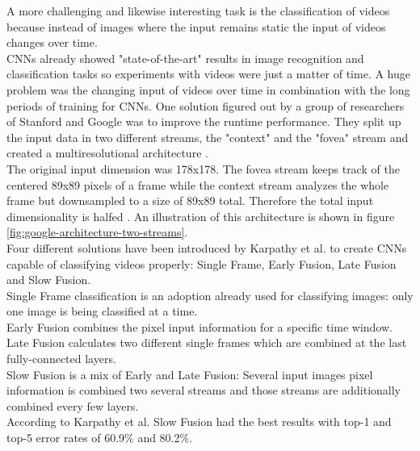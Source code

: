 \documentclass[12pt,twoside]{article}
\theoremstyle{plain}
\theoremstyle{definition}
\theoremstyle{remark}
\begin{document}
A more challenging and likewise interesting task is the classification of videos because instead of images where the input remains static the input of videos changes over time.
\\
CNNs already showed "state-of-the-art" results in image recognition and classification tasks so experiments with videos were just a matter of time. A huge problem was the changing input of videos over time in combination with the long periods of training for CNNs. One solution figured out by a group of researchers of Stanford and Google was to improve the runtime performance. They split up the input data in two different streams, the "context" and the "fovea" stream and created a multiresolutional architecture \cite{GoogleLargeScaleVideoClassification-Karpathy}.
\\
The original input dimension was 178x178. The fovea stream keeps track of the centered 89x89 pixels of a frame while the context stream analyzes the whole frame but downsampled to a size of 89x89 total. Therefore the total input dimensionality is halfed \cite{GoogleLargeScaleVideoClassification-Karpathy}. An illustration of this architecture is shown in figure \ref{fig:google-architecture-two-streams}.
\\
Four different solutions have been introduced by Karpathy et al. to create CNNs capable of classifying videos properly: Single Frame, Early Fusion, Late Fusion and Slow Fusion.
\\
Single Frame classification is an adoption already used for classifying images: only one image is being classified at a time.
\\
Early Fusion combines the pixel input information for a specific time window.
\\
Late Fusion calculates two different single frames which are combined at the last fully-connected layers.
\\
Slow Fusion is a mix of Early and Late Fusion: Several input images pixel information is combined two several streams and those streams are additionally combined every few layers.
\\
According to Karpathy et al. \cite{GoogleLargeScaleVideoClassification-Karpathy} Slow Fusion had the best results with top-1 and top-5 error rates of 60.9\% and 80.2\%.
\end{document}
